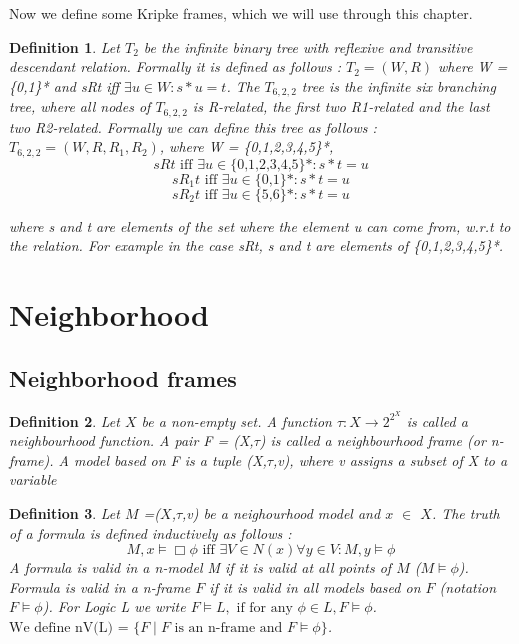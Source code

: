 \documentclass[12pt, a4paper]{scrartcl}
\newtheorem{definition}{Definition}[subsection]
\begin{document}
Now we define some Kripke frames, which we will use through this chapter.

\begin{definition}
    Let $T_2$ be the infinite binary tree with reflexive and transitive descendant relation. \newline Formally it is defined as follows :
    $T_2 = (W,R)$ where W = \{0,1\}* and sRt iff $\exists u\in W : s*u = t$. \newline
    The $T_ {6,2,2}$ tree is the infinite six branching tree, where all nodes of $T_ {6,2,2}$ is R-related, the first two R1-related 
    and the last two R2-related. Formally we can define this tree as follows : $T_ {6,2,2} = (W,R,R_1,R_2)$,
    where W = \{{0,1,2,3,4,5}\}*, $$sRt \mbox{ iff } \exists u \in \mbox{\{0,1,2,3,4,5\}*} : s*t = u $$
    $$ sR_1t  \mbox{ iff } \exists u \in \mbox{\{0,1\}*} : s*t = u$$
    $$ sR_2t  \mbox{ iff } \exists u \in \mbox{\{5,6\}*} : s*t = u$$
    
    where s and t are elements of the set where the element u can come from, w.r.t to the relation. For example in the case sRt,
    s and t are elements of \{0,1,2,3,4,5\}*.        
\end{definition}


\clearpage
\section{Neighborhood}
\subsection{Neighborhood frames}

\begin{definition}
    Let $X$ be a non-empty set. A function  $\tau : X \rightarrow 2^{2^X}$ is called a neighbourhood function. A pair 
    F = (X,$\tau$) is called a neighbourhood frame (or n-frame). A model based on F is a tuple (X,$\tau$,v), where v assigns a subset of X to a variable
        
\end{definition}

\vspace{0.5cm}

\begin{definition}
    Let $M$ =($X$,$\tau$,v) be a neighourhood model and $x$ $\in$ $X$. The truth of a formula is defined inductively as follows :
    $$M,x \models \Box \phi \mbox{ iff } \exists V \in N(x) \forall y \in V : M,y \models \phi$$ 
    A formula is valid in a n-model M if it is valid at all points of $M$ ($M \models \phi$). Formula is valid in a n-frame $F$ if it is valid in
    all models based on $F$ (notation $F \models \phi$). For Logic L we write $ F \models L, \mbox{ if for any }\phi \in L, F \models \phi$. 
    $\mbox{We define nV(L) =  } \{ F \mid F \mbox{ is an n-frame and } F \models \phi \}$.
\end{definition}
\end{document}
